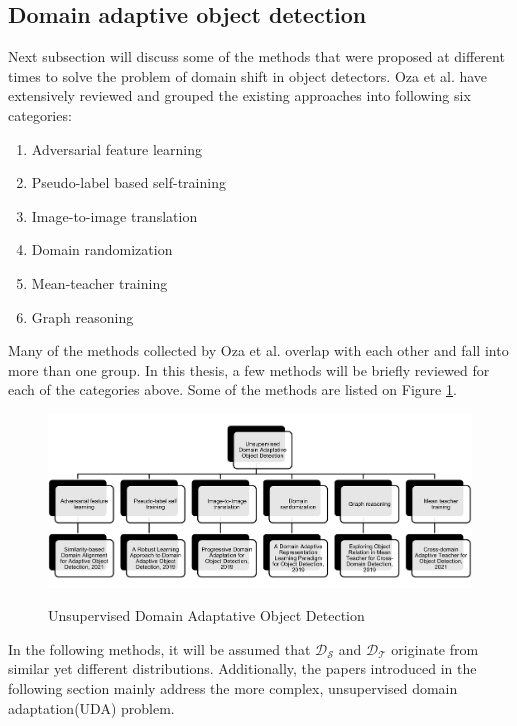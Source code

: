 \documentclass[english, 12pt, a4paper, elec, utf8, a-1b, online]{aaltothesis}
\begin{document}
\subsection{Domain adaptive object detection}
\label{DAobj} 
Next subsection will discuss some of the methods that were proposed at different times to solve the problem of domain shift in object detectors. Oza et al. \cite{Oza2021} have extensively reviewed and grouped the existing approaches into following six categories:
\begin{enumerate}
	\item Adversarial feature learning
	\item Pseudo-label based self-training
	\item Image-to-image translation
	\item Domain randomization 
	\item Mean-teacher training
	\item Graph reasoning
\end{enumerate} 

Many of the methods collected by Oza et al. overlap with each other and fall into more than one group. In this thesis, a few methods will be briefly reviewed for each of the categories above. Some of the methods are listed on Figure \ref{UDA_OD}.

\begin{figure}[htb]
	\begin{center}
		\includegraphics[width=16cm]{./UDA_OD.png}
	\end{center}
	\caption{Unsupervised Domain Adaptative Object Detection}
	\begin{center}
		\label{UDA_OD}
	\end{center}
\end{figure}
\FloatBarrier

In the following methods, it will be assumed that $\mathcal{D_S}$ and $\mathcal{D_T}$ originate from similar yet different distributions. Additionally, the papers introduced in the following section mainly address the more complex, unsupervised domain adaptation(UDA) problem.
\end{document}

